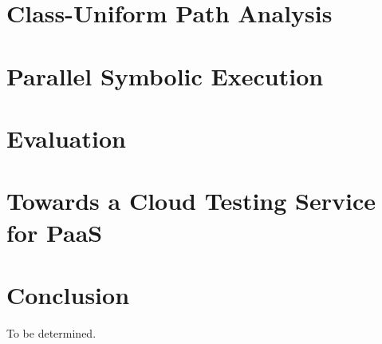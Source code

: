 \documentclass[letterpaper,10pt,oneside]{book}
\begin{document}
\chapter{Class-Uniform Path Analysis}
\label{ch:cupa}



\chapter{Parallel Symbolic Execution}
\label{ch:parsymbex}



\chapter{Evaluation}
\label{ch:evaluation}


\chapter{Towards a Cloud Testing Service for PaaS}
\label{ch:paas}



\chapter{Conclusion}
\label{ch:conclusion}

To be determined.



\end{document}
